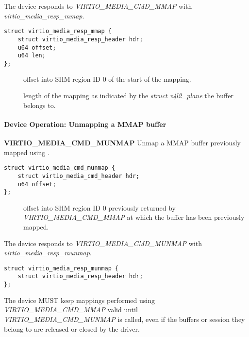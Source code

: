 The device responds to \textit{VIRTIO_MEDIA_CMD_MMAP} with \textit{virtio_media_resp_mmap}.

\begin{lstlisting}
struct virtio_media_resp_mmap {
    struct virtio_media_resp_header hdr;
    u64 offset;
    u64 len;
};
\end{lstlisting}

\begin{description}
\item[] offset into SHM region ID 0 of the start of the mapping.
\item[] length of the mapping as indicated by the \textit{struct v4l2_plane}
the buffer belongs to.
\end{description}

\paragraph{Device Operation: Unmapping a MMAP buffer}

\textbf{VIRTIO_MEDIA_CMD_MUNMAP} Unmap a MMAP buffer previously mapped using .

\begin{lstlisting}
struct virtio_media_cmd_munmap {
    struct virtio_media_cmd_header hdr;
    u64 offset;
};
\end{lstlisting}

\begin{description}
\item[] offset into SHM region ID 0 previously returned by 
\textit{VIRTIO_MEDIA_CMD_MMAP} at which the buffer has been previously mapped.
\end{description}

The device responds to \textit{VIRTIO_MEDIA_CMD_MUNMAP} with \textit{virtio_media_resp_munmap}.

\begin{lstlisting}
struct virtio_media_resp_munmap {
    struct virtio_media_resp_header hdr;
};
\end{lstlisting}


The device MUST keep mappings performed using \textit{VIRTIO_MEDIA_CMD_MMAP}
valid until \textit{VIRTIO_MEDIA_CMD_MUNMAP} is called, even if the buffers or
session they belong to are released or closed by the driver.

